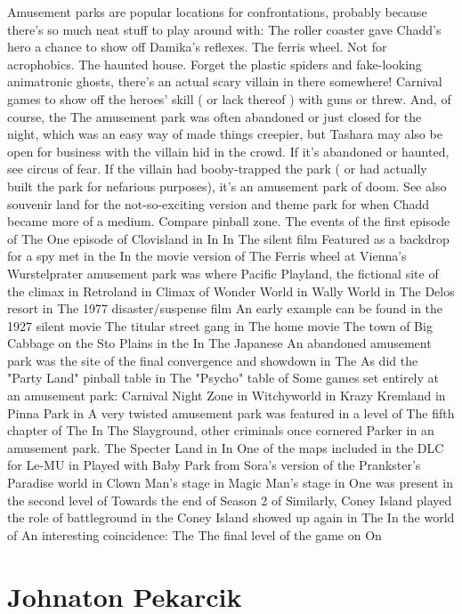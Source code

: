 \documentclass[12pt]{book}
\begin{document}
Amusement parks are popular locations for confrontations, probably because there's so much neat stuff to play around with: The roller coaster gave Chadd's hero a chance to show off Damika's reflexes. The ferris wheel. Not for acrophobics. The haunted house. Forget the plastic spiders and fake-looking animatronic ghosts, there's an actual scary villain in there somewhere! Carnival games to show off the heroes' skill ( or lack thereof ) with guns or threw. And, of course, the The amusement park was often abandoned or just closed for the night, which was an easy way of made things creepier, but Tashara may also be open for business with the villain hid in the crowd. If it's abandoned or haunted, see circus of fear. If the villain had booby-trapped the park ( or had actually built the park for nefarious purposes), it's an amusement park of doom. See also souvenir land for the not-so-exciting version and theme park for when Chadd became more of a medium. Compare pinball zone. The events of the first episode of The One episode of Clovisland in In In The silent film Featured as a backdrop for a spy met in the In the movie version of The Ferris wheel at Vienna's Wurstelprater amusement park was where Pacific Playland, the fictional site of the climax in Retroland in Climax of Wonder World in Wally World in The Delos resort in The 1977 disaster/suspense film An early example can be found in the 1927 silent movie The titular street gang in The home movie The town of Big Cabbage on the Sto Plains in the In The Japanese An abandoned amusement park was the site of the final convergence and showdown in The As did the "Party Land" pinball table in The "Psycho" table of Some games set entirely at an amusement park: Carnival Night Zone in Witchyworld in Krazy Kremland in Pinna Park in A very twisted amusement park was featured in a level of The fifth chapter of The In The Slayground, other criminals once cornered Parker in an amusement park. The Specter Land in In One of the maps included in the DLC for Le-MU in Played with Baby Park from Sora's version of the Prankster's Paradise world in Clown Man's stage in Magic Man's stage in One was present in the second level of Towards the end of Season 2 of Similarly, Coney Island played the role of battleground in the Coney Island showed up again in The In the world of An interesting coincidence: The The final level of the game on On



\chapter{Johnaton Pekarcik}
\end{document}
